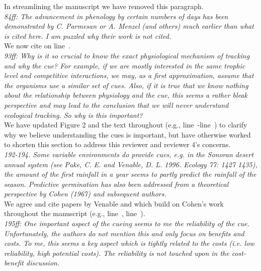 \documentclass[11pt,letterpaper]{article}
\newcommand{\lr}[1]{line~\lineref{#1}}
\begin{document}
In streamlining the manuscript we have removed this paragraph. \\ 

\emph{84ff: The advancement in phenology by certain numbers of days has been demonstrated by C.
Parmesan or A. Menzel (and others) much earlier than what is cited here. I am puzzled why
their work is not cited.}\\

We now cite \citet{Menzel:2006xn,Parmesan:2006cr} on \lr{r1ass1}.\\

\emph{93ff: Why is it so crucial to know the exact physiological mechanism of tracking and why the
cue? For example, if we are mostly interested in the same trophic level and competitive
interactions, we may, as a first approximation, assume that the organisms use a similar set
of cues. Also, if it is true that we know nothing about the relationship between physiology
and the cue, this seems a rather bleak perspective and may lead to the conclusion that we
will never understand ecological tracking. So why is this important?}\\

We have updated Figure 2 and the text throughout (e.g., \lr{r3birdsS}-\lr{r3birdsE}) to clarify why we believe understanding the cues is important, but have otherwise worked to shorten this section to address this reviewer and reviewer 4's concerns. \\

\emph{192-194. Some variable environments do provide cues, e.g. in the Sonoran desert annual system
(see Pake, C. E. and Venable, D. L. 1996. Ecology 77: 1427 1435), the amount of the first
rainfall in a year seems to partly predict the rainfall of the season. Predictive germination
has also been addressed from a theoretical perspective by Cohen (1967) and subsequent
authors.}\\

We agree and cite papers by Venable and which build on Cohen's work throughout the manuscript (e.g., \lr{r1ass2}, \lr{r1ass4}).\\

\emph{195ff: One important aspect of the cueing seems to me the reliability of the cue.
Unfortunately, the authors do not mention this and only focus on benefits and costs. To me,
this seems a key aspect which is tightly related to the costs (i.e. low reliability, high
potential costs). The reliability is not touched upon in the cost-benefit discussion.}\\
\end{document}
